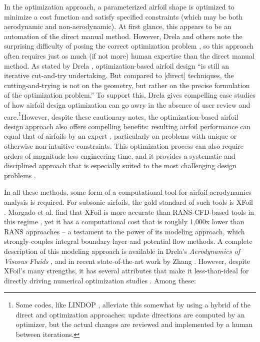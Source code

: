     In the optimization approach, a parameterized airfoil shape is optimized to minimize a cost function and satisfy specified constraints (which may be both aerodynamic and non-aerodynamic). At first glance, this appears to be an automation of the direct manual method. However, Drela and others note the surprising difficulty of posing the correct optimization problem \cite{drela_pros_1998, kroo_multidisciplinary_1997}, so this approach often requires just as much (if not more) human expertise than the direct manual method. As stated by Drela \cite{drela_pros_1998}, optimization-based airfoil design ``is still an iterative cut-and-try undertaking. But compared to [direct] techniques, the cutting-and-trying is not on the geometry, but rather on the precise formulation of the optimization problem.'' To support this, Drela gives compelling case studies of how airfoil design optimization can go awry in the absence of user review and care.\footnote{Some codes, like LINDOP \cite{mses}, alleviate this somewhat by using a hybrid of the direct and optimization approaches: update directions are computed by an optimizer, but the actual changes are reviewed and implemented by a human between iterations.}However, despite these cautionary notes, the optimization-based airfoil design approach also offers compelling benefits: resulting airfoil performance can equal that of airfoils by an expert \cite{drela_pros_1998}, particularly on problems with unique or otherwise non-intuitive constraints. This optimization process can also require orders of magnitude less engineering time, and it provides a systematic and disciplined approach that is especially suited to the most challenging design problems \cite{he2019robust}.

    In all these methods, some form of a computational tool for airfoil aerodynamics analysis is required. For subsonic airfoils, the gold standard of such tools is XFoil \cite{drela_xfoil_1989}. Morgado et al. find that XFoil is more accurate than RANS-CFD-based tools in this regime \cite{morgado2016xfoil}, yet it has a computational cost that is roughly 1,000x lower than RANS approaches -- a testament to the power of its modeling approach, which strongly-couples integral boundary layer and potential flow methods. A complete description of this modeling approach is available in Drela's \textit{Aerodynamics of Viscous Fluids} \cite{drela_aerodynamics_2019}, and in recent state-of-the-art work by Zhang \cite{zhang_threedimensional_2022, zhang_nonparametric_2017}. However, despite XFoil's many strengths, it has several attributes that make it less-than-ideal for directly driving numerical optimization studies \cite{adler_cfd_2022}. Among these:

